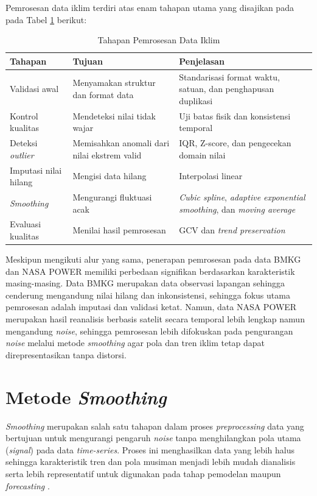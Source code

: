 Pemrosesan data iklim terdiri atas enam tahapan utama yang disajikan pada pada Tabel \ref{tab:tahapan_preprocessing} berikut:
\begin{table}[H]
\centering
\caption{Tahapan Pemrosesan Data Iklim}
\label{tab:tahapan_preprocessing}
\small
\begin{tabular}{|p{3.5cm}|p{5cm}|p{4cm}|}
\hline
\textbf{Tahapan} & \textbf{Tujuan} & \textbf{Penjelasan} \\
\hline
Validasi awal & Menyamakan struktur dan format data & Standarisasi format waktu, satuan, dan penghapusan duplikasi \\
\hline
Kontrol kualitas & Mendeteksi nilai tidak wajar & Uji batas fisik dan konsistensi temporal \\
\hline
Deteksi \textit{outlier} & Memisahkan anomali dari nilai ekstrem valid & IQR, Z-score, dan pengecekan domain nilai \\
\hline
Imputasi nilai hilang & Mengisi data hilang & Interpolasi linear \\
\hline
\textit{Smoothing} & Mengurangi fluktuasi acak & \textit{Cubic spline}, \textit{adaptive exponential smoothing}, dan \textit{moving average} \\
\hline
Evaluasi kualitas & Menilai hasil pemrosesan & GCV dan \textit{trend preservation} \\
\hline
\end{tabular}
\end{table}

Meskipun mengikuti alur yang sama, penerapan pemrosesan pada data BMKG dan NASA POWER memiliki perbedaan signifikan berdasarkan karakteristik masing-masing. Data BMKG merupakan data observasi lapangan sehingga cenderung mengandung nilai hilang dan inkonsistensi, sehingga fokus utama pemrosesan adalah imputasi dan validasi ketat. Namun, data NASA POWER merupakan hasil reanalisis berbasis satelit secara temporal lebih lengkap namun mengandung \textit{noise}, sehingga pemrosesan lebih difokuskan pada pengurangan \textit{noise} melalui metode \textit{smoothing} agar pola dan tren iklim tetap dapat direpresentasikan tanpa distorsi.

\section{Metode \textit{Smoothing}}
\textit{Smoothing} merupakan salah satu tahapan dalam proses \textit{preprocessing} data yang bertujuan untuk mengurangi pengaruh \textit{noise} tanpa menghilangkan pola utama (\textit{signal}) pada data \textit{time-series}. Proses ini menghasilkan data yang lebih halus sehingga karakteristik tren dan pola musiman menjadi lebih mudah dianalisis serta lebih representatif untuk digunakan pada tahap pemodelan maupun \textit{forecasting} \citep{castillo2022}.

